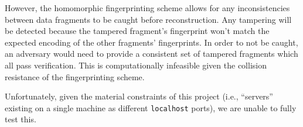 \documentclass[../veristore_security_model.tex]{subfiles}
\begin{document}
However, the homomorphic fingerprinting scheme allows for any inconsistencies between data fragments to be caught before reconstruction.  Any tampering will be detected because the tampered fragment's fingerprint won't match the expected encoding of the other fragments' fingerprints. In order to not be caught, an adversary would need to provide a consistent set of tampered fragments which all pass verification. This is computationally infeasible given the collision resistance of the fingerprinting scheme.

Unfortunately, given the material constraints of this project (i.e., ``servers'' existing on a single machine as different \texttt{localhost} ports), we are unable to fully test this.

\newpage
\end{document}
